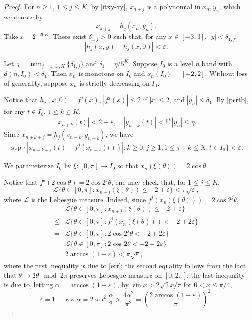 \documentclass{amsart}
\theoremstyle{definition}
\begin{document}
\begin{proof}
For $n\ge1$, $1\le j\le K$, by \eqref{itxy-xy}, 
$x_{n+j}$ is a polynomial in $x_{n},y_{n}$, which we denote by 
$$x_{n+j}=h_j(x_{n},y_{n}).$$
Take $\varepsilon=2^{-20K}$.
There exist $\delta_{1,j}>0$ such that, for any 
$x\in [-3,3]$, $|y|<\delta_{1,j}$,
\begin{equation}\label{pertb}
|h_j(x,y) - h_j(x,0)|<\varepsilon.
\end{equation}

Let $\eta=\min_{j=1,\ldots,K}\{\delta_{1,{j}}\}$ and $\delta_1=\eta/5^K$.
Suppose $I_0$ is a level $n$ band with $d(n,I_0)<\delta_1$.
Then $x_n$ is monotone on $I_0$ and $x_n(I_0)=[-2,2]$.
Without loss of generality, suppose $x_n$ is strictly decreasing on $I_0$.

Notice that $h_j(x,0)=f^j(x)$, $|f^j(x)|\le2$ if $|x|\le2$, and $|y_n|\le\delta_1$.
By \eqref{pertb}, for any $t\in I_0$, $1\le k\le K$,
$$|x_{n+k}(t)|<2+\varepsilon,\quad |y_{n+k}(t)|<5^k|y_n|\le\eta.$$
Since  $x_{n+k+j}=h_j(x_{n+k},y_{n+k})$, we have
\begin{equation}\label{err}
\sup\{|x_{n+k+j}(t)-f^j(x_{n+k}(t))| : k\ge0, j\ge1, 1\le j+k \le K,
t\in I_0 \}<\varepsilon.
\end{equation}

We parameterize $I_0$ by $\xi: [0,\pi]\to I_0$ 
so that $x_{n}(\xi(\theta))=2\cos{\theta}$.

Notice that $f^j(2\cos{\theta})=2\cos{2^j\theta}$,
one may check that, for $1\le j\le K$,
\begin{equation}\label{meas}
\mathcal{L}\{\theta\in[0,\pi]:x_{n+j}(\xi(\theta))\le -2+\varepsilon\}
<\pi\sqrt{\varepsilon},
\end{equation}
where $\mathcal{L}$ is the Lebesgue measure. 
Indeed, since $f^j(x_n(\xi(\theta)))=2\cos 2^j\theta$, 
$$\begin{array}{cl}
&\mathcal{L}\{\theta\in[0,\pi] : x_{n+j}(\xi(\theta))\le -2+\varepsilon\}\\
\le &\mathcal{L}\{\theta\in[0,\pi] : f^j(x_n(\xi(\theta)))< -2+2\varepsilon\}\\
= &\mathcal{L}\{\theta\in[0,\pi] : 2\cos 2^j\theta< -2+2\varepsilon\}\\
= &\mathcal{L}\{\theta\in[0,\pi] : 2\cos 2\theta< -2+2\varepsilon\}\\
=&2\arccos(1-\varepsilon)<\pi\sqrt{\varepsilon},
\end{array}$$
where the first inequality is due to \eqref{err};
the second equality follows from the fact that 
$\theta\to 2\theta\mod 2\pi$ preserves Lebesgue measure on $[0,2\pi]$;
the last inequality is due to, letting $\alpha=\arccos(1-\varepsilon)$, 
by $\sin x>{2\sqrt{2}x}/{\pi}$ for $0< x\le \pi/4$,
$$\varepsilon=1-\cos\alpha=2\sin^2\frac{\alpha}{2}
>\frac{4\alpha^2}{\pi^2}=\left(\frac{2\arccos(1-\varepsilon)}{\pi}\right)^2.$$


\end{proof}
\end{document}
